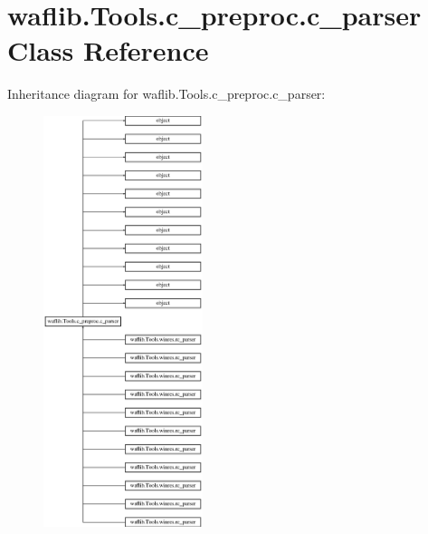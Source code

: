 \hypertarget{classwaflib_1_1_tools_1_1c__preproc_1_1c__parser}{}\section{waflib.\+Tools.\+c\+\_\+preproc.\+c\+\_\+parser Class Reference}
\label{classwaflib_1_1_tools_1_1c__preproc_1_1c__parser}
Inheritance diagram for waflib.\+Tools.\+c\+\_\+preproc.\+c\+\_\+parser\+:\begin{figure}[H]
\begin{center}
\leavevmode
\includegraphics[height=12.000000cm]{classwaflib_1_1_tools_1_1c__preproc_1_1c__parser}
\end{center}
\end{figure}
